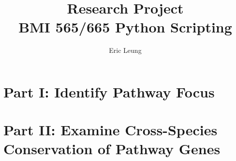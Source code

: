\documentclass[12pt, a4paper]{article}
\author{Eric Leung}
\title{Research Project \\
	BMI 565/665 Python Scripting}
\begin{document}
\maketitle

\section*{Part I: Identify Pathway Focus}

\section*{Part II: Examine Cross-Species Conservation of Pathway Genes}
\end{document}

